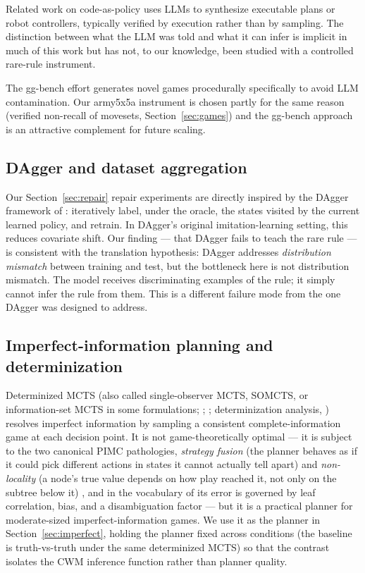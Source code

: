 \documentclass[11pt]{article}
\theoremstyle{remark}
\begin{document}
Related work on code-as-policy \citep[e.g.,][]{liang2023codeaspolicies,gao2023pal} uses LLMs to synthesize executable plans or robot controllers, typically verified by execution rather than by sampling. The distinction between what the LLM was told and what it can infer is implicit in much of this work but has not, to our knowledge, been studied with a controlled rare-rule instrument.

The gg-bench effort \citep{ggbench2025} generates novel games procedurally specifically to avoid LLM contamination. Our army5x5a instrument is chosen partly for the same reason (verified non-recall of movesets, Section~\ref{sec:games}) and the gg-bench approach is an attractive complement for future scaling.

\subsection{DAgger and dataset aggregation}

Our Section~\ref{sec:repair} repair experiments are directly inspired by the DAgger framework of \citet{ross2011dagger}: iteratively label, under the oracle, the states visited by the current learned policy, and retrain. In DAgger's original imitation-learning setting, this reduces covariate shift. Our finding --- that DAgger fails to teach the rare rule --- is consistent with the translation hypothesis: DAgger addresses \emph{distribution mismatch} between training and test, but the bottleneck here is not distribution mismatch. The model receives discriminating examples of the rule; it simply cannot infer the rule from them. This is a different failure mode from the one DAgger was designed to address.

\subsection{Imperfect-information planning and determinization}

Determinized MCTS (also called single-observer MCTS, SOMCTS, or information-set MCTS in some formulations; \citealp{cowling2012ismcts}; \citealp{whitehouse2011determinization}; determinization analysis, \citealp{long2010pimc}) resolves imperfect information by sampling a consistent complete-information game at each decision point. It is not game-theoretically optimal --- it is subject to the two canonical PIMC pathologies, \emph{strategy fusion} (the planner behaves as if it could pick different actions in states it cannot actually tell apart) and \emph{non-locality} (a node's true value depends on how play reached it, not only on the subtree below it) \citep{frank1998incomplete}, and in the vocabulary of \citet{long2010pimc} its error is governed by leaf correlation, bias, and a disambiguation factor --- but it is a practical planner for moderate-sized imperfect-information games. We use it as the planner in Section~\ref{sec:imperfect}, holding the planner fixed across conditions (the baseline is truth-vs-truth under the same determinized MCTS) so that the contrast isolates the CWM inference function rather than planner quality.
\end{document}
